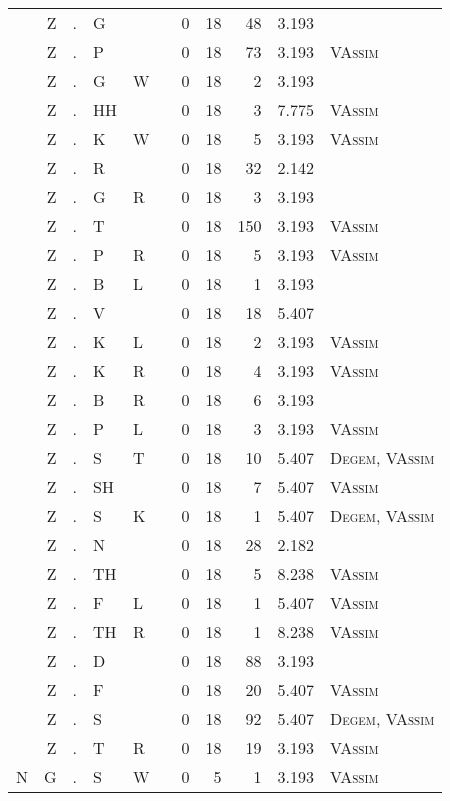 \begin{longtable}{r@{ } r@{ } c@{ } l@{ } l@{ } l@{ } r r r r l }
 & Z & . & G &  &  & 0 & 18 & 48 & 3.193 &  \\
 & Z & . & P &  &  & 0 & 18 & 73 & 3.193 & \textsc{VAssim} \\
 & Z & . & G & W &  & 0 & 18 & 2 & 3.193 &  \\
 & Z & . & HH &  &  & 0 & 18 & 3 & 7.775 & \textsc{VAssim} \\
 & Z & . & K & W &  & 0 & 18 & 5 & 3.193 & \textsc{VAssim} \\
 & Z & . & R &  &  & 0 & 18 & 32 & 2.142 &  \\
 & Z & . & G & R &  & 0 & 18 & 3 & 3.193 &  \\
 & Z & . & T &  &  & 0 & 18 & 150 & 3.193 & \textsc{VAssim} \\
 & Z & . & P & R &  & 0 & 18 & 5 & 3.193 & \textsc{VAssim} \\
 & Z & . & B & L &  & 0 & 18 & 1 & 3.193 &  \\
 & Z & . & V &  &  & 0 & 18 & 18 & 5.407 &  \\
 & Z & . & K & L &  & 0 & 18 & 2 & 3.193 & \textsc{VAssim} \\
 & Z & . & K & R &  & 0 & 18 & 4 & 3.193 & \textsc{VAssim} \\
 & Z & . & B & R &  & 0 & 18 & 6 & 3.193 &  \\
 & Z & . & P & L &  & 0 & 18 & 3 & 3.193 & \textsc{VAssim} \\
 & Z & . & S & T &  & 0 & 18 & 10 & 5.407 & \textsc{Degem}, \textsc{VAssim} \\
 & Z & . & SH &  &  & 0 & 18 & 7 & 5.407 & \textsc{VAssim} \\
 & Z & . & S & K &  & 0 & 18 & 1 & 5.407 & \textsc{Degem}, \textsc{VAssim} \\
 & Z & . & N &  &  & 0 & 18 & 28 & 2.182 &  \\
 & Z & . & TH &  &  & 0 & 18 & 5 & 8.238 & \textsc{VAssim} \\
 & Z & . & F & L &  & 0 & 18 & 1 & 5.407 & \textsc{VAssim} \\
 & Z & . & TH & R &  & 0 & 18 & 1 & 8.238 & \textsc{VAssim} \\
 & Z & . & D &  &  & 0 & 18 & 88 & 3.193 &  \\
 & Z & . & F &  &  & 0 & 18 & 20 & 5.407 & \textsc{VAssim} \\
 & Z & . & S &  &  & 0 & 18 & 92 & 5.407 & \textsc{Degem}, \textsc{VAssim} \\
 & Z & . & T & R &  & 0 & 18 & 19 & 3.193 & \textsc{VAssim} \\
N & G & . & S & W &  & 0 & 5 & 1 & 3.193 & \textsc{VAssim} \\

\end{longtable}
